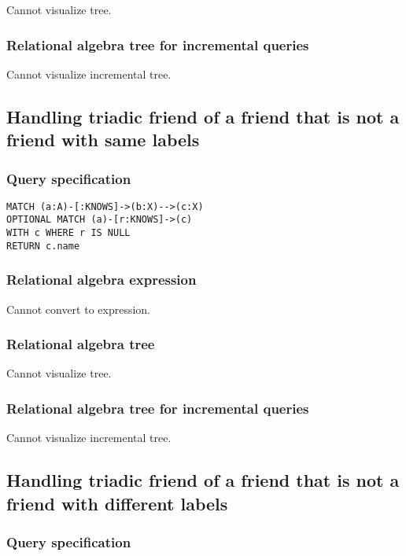Cannot visualize tree.

\subsubsection*{Relational algebra tree for incremental queries}

Cannot visualize incremental tree.

\subsection{Handling triadic friend of a friend that is not a friend with same labels}

\subsubsection*{Query specification}

\begin{lstlisting}
MATCH (a:A)-[:KNOWS]->(b:X)-->(c:X)
OPTIONAL MATCH (a)-[r:KNOWS]->(c)
WITH c WHERE r IS NULL
RETURN c.name
\end{lstlisting}

\subsubsection*{Relational algebra expression}

Cannot convert to expression.

\subsubsection*{Relational algebra tree}

Cannot visualize tree.

\subsubsection*{Relational algebra tree for incremental queries}

Cannot visualize incremental tree.

\subsection{Handling triadic friend of a friend that is not a friend with different labels}

\subsubsection*{Query specification}

